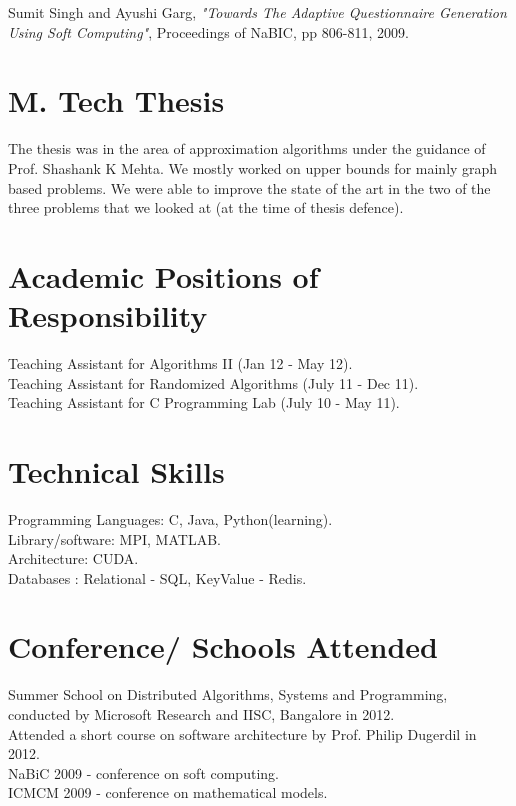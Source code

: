 \documentclass[margin,line]{resume}
\begin{document}
\begin{resume}
\vspace{-2mm}
Sumit Singh and Ayushi Garg, \textit{"Towards The Adaptive Questionnaire Generation Using Soft Computing"}, Proceedings of NaBIC, pp 806-811, 2009.



    \section{\mysidestyle M. Tech Thesis}
The thesis was in the area of approximation algorithms under the guidance of Prof. Shashank K Mehta. 
We mostly worked on upper bounds for mainly graph based problems. We were able to improve the state of the art in  the two of the three problems that we looked at (at the time of thesis defence).
   
   

    \section{\mysidestyle Academic Positions of Responsibility} 
	Teaching Assistant for Algorithms II (Jan 12 - May 12).\\ 
	Teaching Assistant for Randomized Algorithms (July 11 - Dec 11).\\ 
	Teaching Assistant for C Programming Lab (July 10 - May 11).\\
    \section{\mysidestyle Technical \quad Skills} 
	Programming Languages: C, Java, Python(learning).\\
	Library/software: MPI, MATLAB. \\
	Architecture: CUDA. \\
	Databases : Relational - SQL, KeyValue - Redis. \\
    \section{\mysidestyle Conference/ Schools Attended}
    Summer School on Distributed Algorithms, Systems and Programming, conducted by Microsoft Research and IISC, Bangalore in 2012. \\
    Attended a short course on software architecture by Prof. Philip Dugerdil in 2012. \\
    NaBiC 2009 - conference on soft computing. \\
    ICMCM 2009 - conference on mathematical models. \\


\end{resume}
\end{document}

